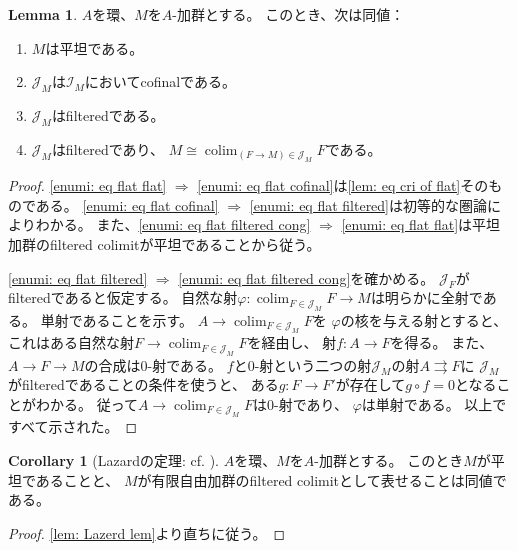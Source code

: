 \documentclass[uplatex]{jsarticle}
\theoremstyle{definition}
\newtheorem{cor}[cor]{Corollary}
\newtheorem{lem}[lem]{Lemma}
\theoremstyle{plain}
\DeclareMathOperator{\colim}{\mathrm{colim}}
\newcommand{\mcI}{\mathcal{I}}
\newcommand{\mcJ}{\mathcal{J}}
\begin{document}
\begin{lem}\label{lem: Lazerd lem}
  \(A\)を環、\(M\)を\(A\)-加群とする。
  このとき、次は同値：
  \begin{enumerate}
    \item \label{enumi: eq flat flat}
    \(M\)は平坦である。
    \item \label{enumi: eq flat cofinal}
    \(\mcJ_M\)は\(\mcI_M\)においてcofinalである。
    \item \label{enumi: eq flat filtered}
    \(\mcJ_M\)はfilteredである。
    \item \label{enumi: eq flat filtered cong}
    \(\mcJ_M\)はfilteredであり、
    \(M\cong \colim _{(F\to M)\in \mcJ_M}F\)である。
  \end{enumerate}
\end{lem}

\begin{proof}
  \ref{enumi: eq flat flat} \(\Rightarrow\)
  \ref{enumi: eq flat cofinal}は\autoref{lem: eq cri of flat}そのものである。
  \ref{enumi: eq flat cofinal} \(\Rightarrow\)
  \ref{enumi: eq flat filtered}は初等的な圏論によりわかる。
  また、\ref{enumi: eq flat filtered cong} \(\Rightarrow\)
  \ref{enumi: eq flat flat}は平坦加群のfiltered colimitが平坦であることから従う。

  \ref{enumi: eq flat filtered} \(\Rightarrow\)
  \ref{enumi: eq flat filtered cong}を確かめる。
  \(\mcJ_F\)がfilteredであると仮定する。
  自然な射\(\varphi:\colim_{F\in \mcJ_M}F\to M\)は明らかに全射である。
  単射であることを示す。
  \(A\to \colim_{F\in\mcJ_M}F\)を
  \(\varphi\)の核を与える射とすると、
  これはある自然な射\(F\to \colim_{F\in\mcJ_M}F\)を経由し、
  射\(f:A\to F\)を得る。
  また、\(A\to F\to M\)の合成は\(0\)-射である。
  \(f\)と\(0\)-射という二つの射\(\mcJ_M\)の射\(A\rightrightarrows F\)に
  \(\mcJ_M\)がfilteredであることの条件を使うと、
  ある\(g:F\to F'\)が存在して\(g\circ f=0\)となることがわかる。
  従って\(A\to \colim_{F\in\mcJ_M}F\)は\(0\)-射であり、
  \(\varphi\)は単射である。
  以上ですべて示された。
\end{proof}



\begin{cor}[{Lazardの定理: cf. \cite[\href{https://stacks.math.columbia.edu/tag/058G}{Tag 058G}]{stacks-project}}]
  \(A\)を環、\(M\)を\(A\)-加群とする。
  このとき\(M\)が平坦であることと、
  \(M\)が有限自由加群のfiltered colimitとして表せることは同値である。
\end{cor}

\begin{proof}
  \autoref{lem: Lazerd lem}より直ちに従う。
\end{proof}
\end{document}
